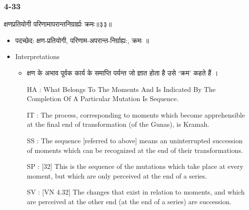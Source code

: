 \begin{frame}[fragile]\frametitle{4-33}
\begin{sanskrit}
क्षणप्रतियोगी परिणामापरान्तनिग्रार्ह्यः क्रमः॥३३॥
\end{sanskrit}

	\begin{itemize}
	\item पदच्छेद:  क्षण-प्रतियोगी, परिणाम-अपरान्त-निर्ग्राह्य:, क्रमः ॥
	\item Interpretations
		\begin{itemize}	
		\item क्षण के अभाव पूर्वक कार्य के समाप्ति पर्यन्त जो ज्ञात होता है उसे ‘क्रम’ कहते हैं ।
		\item [HA]: What Belongs To The Moments And Is Indicated By The Completion Of A Particular Mutation Is Sequence.
		\item [IT]: The process, corresponding to moments which become apprehensible at the final end of transformation (of the Gunas), is Kramah.
		\item [SS]: The sequence [referred to above] means an uninterrupted succession of moments which can be recognized at the end of their transformations.
		\item [SP]: [32] This is the sequence of the mutations which take place at every moment, but which are only perceived at the end of a series.
		\item [SV]: [VN 4.32] The changes that exist in relation to moments, and which are perceived at the other end (at the end of a series) are succession. 
		\end{itemize}
	\end{itemize}
\end{frame}

